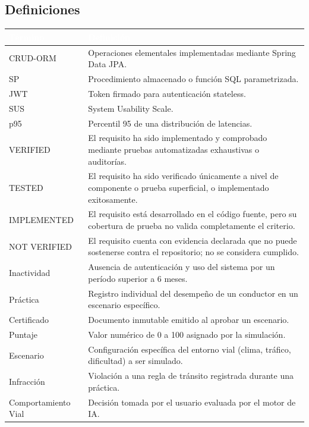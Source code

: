 \documentclass[11pt,a4paper]{article}
\begin{document}
\subsection{Definiciones}
\begin{table}[h]
    \centering
    \renewcommand{\arraystretch}{1.3}
    \begin{tabularx}{\textwidth}{@{}|l|X|@{}}
        \hline
        \rowcolor{uteqblue}
        \textcolor{white}{\textbf{Término}} & \textcolor{white}{\textbf{Definición}} \\ \hline
        CRUD-ORM & Operaciones elementales implementadas mediante Spring Data JPA. \\ \hline
        SP & Procedimiento almacenado o función SQL parametrizada. \\ \hline
        JWT & Token firmado para autenticación stateless. \\ \hline
        SUS & System Usability Scale. \\ \hline
        p95 & Percentil 95 de una distribución de latencias. \\ \hline
        VERIFIED & El requisito ha sido implementado y comprobado mediante pruebas automatizadas exhaustivas o auditorías. \\ \hline
        TESTED & El requisito ha sido verificado únicamente a nivel de componente o prueba superficial, o implementado exitosamente. \\ \hline
        IMPLEMENTED & El requisito está desarrollado en el código fuente, pero su cobertura de prueba no valida completamente el criterio. \\ \hline
        NOT VERIFIED & El requisito cuenta con evidencia declarada que no puede sostenerse contra el repositorio; no se considera cumplido. \\ \hline
        Inactividad & Ausencia de autenticación y uso del sistema por un período superior a 6 meses. \\ \hline
        Práctica & Registro individual del desempeño de un conductor en un escenario específico. \\ \hline
        Certificado & Documento inmutable emitido al aprobar un escenario. \\ \hline
        Puntaje & Valor numérico de 0 a 100 asignado por la simulación. \\ \hline
        Escenario & Configuración específica del entorno vial (clima, tráfico, dificultad) a ser simulado. \\ \hline
        Infracción & Violación a una regla de tránsito registrada durante una práctica. \\ \hline
        Comportamiento Vial & Decisión tomada por el usuario evaluada por el motor de IA. \\ \hline
    \end{tabularx}
\end{table}
\end{document}
